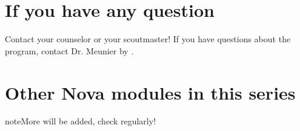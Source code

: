 \documentclass[letterpaper,10pt,english,openany,oneside]{sphinxmanual}
\begin{document}
\section{If you have any question}
\label{\detokenize{introduction:if-you-have-any-question}}
Contact your counselor or your scoutmaster! If you have questions about the program, contact Dr. Meunier  by .


\section{Other Nova modules in this series}
\label{\detokenize{introduction:other-nova-modules-in-this-series}}
\begin{sphinxadmonition}{note}{More will be added, check regularly!}


\end{sphinxadmonition}
\end{document}
